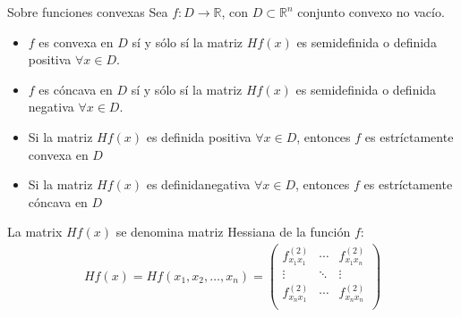 \begin{Teo} Sobre funciones convexas
Sea $f:D\rightarrow\mathbb{R}$, con $D\subset \mathbb{R}^{n}$ conjunto convexo no vac\'io.
\begin{itemize}
\item[i) ] $f$ es convexa en $D$ s\'i y s\'olo s\'i la matriz $Hf\left(x\right)$ es semidefinida o definida positiva $\forall x\in D$.

\item[ii) ] $f$ es c\'oncava en $D$ s\'i y s\'olo s\'i la matriz $Hf\left(x\right)$ es semidefinida o definida negativa $\forall x\in D$.

\item[iii) ] Si la matriz $Hf\left(x\right)$ es definida positiva $\forall x\in D$, entonces $f$ es estr\'ictamente convexa en $D$

\item[iii) ] Si la matriz $Hf\left(x\right)$ es definidanegativa $\forall x\in D$, entonces $f$ es estr\'ictamente c\'oncava en $D$
\end{itemize}

La matrix $Hf\left(x\right)$ se denomina matriz Hessiana de la funci\'on $f$:
\begin{eqnarray*}
Hf\left(x\right)=Hf\left(x_1,x_{2},\dots,x_{n}\right)=\left(\begin{array}{ccc}
f^{(2)}_{x_1 x_1} & \cdots &f^{(2)}_{x_1 x_n}\\ 
\vdots &\ddots & \vdots\\
f^{(2)}_{x_n x_1} & \cdots &f^{(2)}_{x_n x_n}\\ 
\end{array}\right)
\end{eqnarray*}

\end{Teo}



